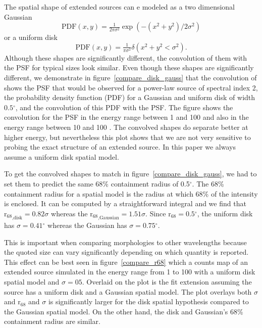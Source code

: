 \documentclass[12pt,preprint]{aastex}
\newcommand{\gev}{\text{GeV}\xspace}
\newcommand{\rsixeight}{{\ensuremath{\text{r}_{68}}}\xspace}
\renewcommand{\deg}{\ensuremath{^\circ}\xspace}
\begin{document}
The spatial shape of extended sources can e modeled
as a two dimensional Gaussian
\begin{equation}
  \text{PDF}(x,y)=\tfrac{1}{2\pi\sigma^2}\exp\left(-(x^2+y^2)/2\sigma^2\right)
\end{equation}
or a uniform disk
\begin{equation}
  \text{PDF}(x,y)=\tfrac{1}{\pi\sigma^2}\delta\left(x^2+y^2<\sigma^2\right).
\end{equation}
Although these shapes are significantly different, the convolution
of them with the PSF for typical sizes look similar.  Even
though these shapes are significantly different, we demonstrate in
figure~\ref{compare_disk_gauss} that the convolution of shows the
PSF that would be observed for a power-law source of spectral index
2, the probability density function (PDF) for a Gaussian and uniform
disk of width $0.5\deg$, and the convolution of this PDF with the PSF.
The figure shows the convolution for the PSF in the energy range between
1 \gev and 100 \gev and also in the energy range between 10 \gev and
100 \gev.  The convolved shapes do separate better at higher energy, but
nevertheless this plot shows that we are not very sensitive to probing
the exact structure of an extended source.  In this paper we always
assume a uniform disk spatial model.

To get the convolved shapes to match in figure~\ref{compare_disk_gauss},
we had to set them to predict the same 68\% containment radius of 0.5\deg.  The
68\% containment radius for a spatial model is the radius at which 68\%
of the intensity is enclosed.  It can be computed by a straightforward
integral and we find that $\rsixeight_\text{,disk}=0.82\sigma$ whereas the
$\rsixeight_\text{,Gaussian}=1.51\sigma$.  Since $\rsixeight=0.5\deg$,
the uniform disk has $\sigma=0.41\deg$ whereas the Gaussian has
$\sigma=0.75\deg$.

This is important when comparing morphologies to other wavelengths
because the quoted size can vary significantly depending on which quantity
is reported.  This effect can be best seen in figure~\ref{compare_r68}
which a counts map of an extended source simulated in the energy
range from 1 \gev to 100 \gev with a uniform disk spatial model and
$\sigma=05$. Overlaid on the plot is the fit extension assuming the
source has a uniform disk and a Gaussian spatial model. The plot overlays
both $\sigma$ and $\rsixeight$ and $\sigma$ is significantly larger for
the disk spatial hypothesis compared to the Gaussian spatial model. On
the other hand, the disk and Gaussian's 68\% containment radius are
similar.
\end{document}
